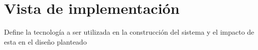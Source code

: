 \chapter{Vista de implementaci\'on}

Define la tecnolog\'ia a ser utilizada en la construcci\'on del sistema y el impacto de esta en el dise\~no planteado